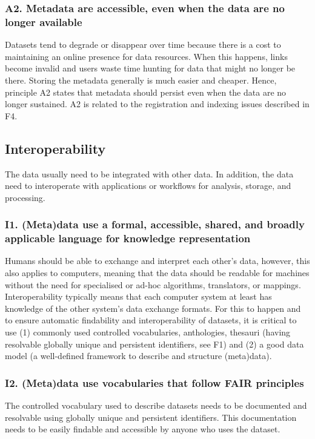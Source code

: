 \subsubsection*{A2. Metadata are accessible, even when the data are no longer available}

Datasets tend to degrade or disappear over time because there is a cost to maintaining an online presence for data resources. When this happens, links become invalid and users waste time hunting for data that might no longer be there. Storing the metadata generally is much easier and cheaper. Hence, principle A2 states that metadata should persist even when the data are no longer sustained. A2 is related to the registration and indexing issues described in F4. 


\subsection*{Interoperability}
The data usually need to be integrated with other data. In addition, the data need to interoperate with applications or workflows for analysis, storage, and processing.


\subsubsection*{I1. (Meta)data use a formal, accessible, shared, and broadly applicable language for knowledge representation}
Humans should be able to exchange and interpret each other’s data, however, this also applies to computers, meaning that the data should be readable for machines without the need for specialised or ad-hoc algorithms, translators, or mappings. Interoperability typically means that each computer system at least has knowledge of the other system’s data exchange formats. For this to happen and to ensure automatic findability and interoperability of datasets, it is critical to use (1) commonly used controlled vocabularies, anthologies, thesauri (having resolvable globally unique and persistent identifiers, see F1) and (2) a good data model (a well-defined framework to describe and structure (meta)data).

\subsubsection*{I2. (Meta)data use vocabularies that follow FAIR principles}
The controlled vocabulary used to describe datasets needs to be documented and resolvable using globally unique and persistent identifiers. This documentation needs to be easily findable and accessible by anyone who uses the dataset.

